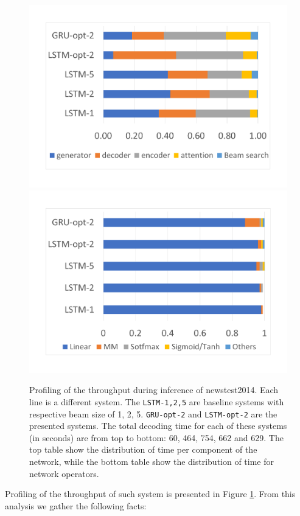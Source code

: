 \documentclass[11pt,a4paper]{article}
\begin{document}
\begin{figure}
\includegraphics[width=\linewidth]{decoder.pdf}
\includegraphics[width=\linewidth]{decoder_linear.pdf}
\caption{Profiling of the throughput during inference of newstest2014. Each line is a different system. The {\tt LSTM-1,2,5} are baseline systems with respective beam size of 1, 2, 5. {\tt GRU-opt-2} and {\tt LSTM-opt-2} are the presented systems. The total decoding time for each of these systems (in seconds) are from top to bottom: 60, 464, 754, 662 and 629. The top table show the distribution of time per component of the network, while the bottom table show the distribution of time for network operators.}
\label{fig:decoding_cost}
\end{figure}

Profiling of the throughput of such system is presented in Figure \ref{fig:decoding_cost}. From this analysis we gather the following facts:
\end{document}
